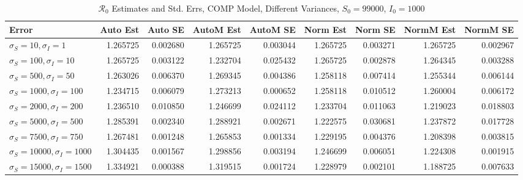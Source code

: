 \documentclass[12pt]{article}
\newcommand{\rr}{\ensuremath{\mathcal{R}_0}}
\begin{document}
\begin{table}[H]
	
	\caption{$\rr$ Estimates and Std. Errs, COMP Model, 
		Different Variances, $S_0 = 99000$, $I_0 = 1000$}
	\begin{footnotesize}
		\hskip -1.7cm
	\begin{tabular}{l|r|r|r|r|r|r|r|r}
		\hline
		Error & Auto Est & Auto SE & AutoM Est & AutoM SE & Norm Est & Norm SE & NormM Est & NormM SE\\
		\hline
		$\sigma_S = 10, \sigma_I = 1$ & 1.265725 & 0.002680 & 1.265725 & 0.003044 & 1.265725 & 0.003271 & 1.265725 & 0.002967\\
		\hline
		$\sigma_S = 100, \sigma_I = 10$ & 1.265725 & 0.003122 & 1.232704 & 0.025432 & 1.265725 & 0.002878 & 1.264345 & 0.003288\\
		\hline
		$\sigma_S = 500, \sigma_I = 50$ & 1.263026 & 0.006370 & 1.269345 & 0.004386 & 1.258118 & 0.007414 & 1.255344 & 0.006144\\
		\hline
		$\sigma_S = 1000, \sigma_I = 100$ & 1.234715 & 0.006079 & 1.273213 & 0.000652 & 1.258118 & 0.010512 & 1.260004 & 0.006172\\
		\hline
		$\sigma_S = 2000, \sigma_I = 200$ & 1.236510 & 0.010850 & 1.246699 & 0.024112 & 1.233704 & 0.011063 & 1.219023 & 0.018803\\
		\hline
		$\sigma_S = 5000, \sigma_I = 500$ & 1.285391 & 0.002340 & 1.288921 & 0.002671 & 1.222575 & 0.030681 & 1.237872 & 0.017728\\
		\hline
		$\sigma_S = 7500, \sigma_I = 750$ & 1.267481 & 0.001248 & 1.265853 & 0.001334 & 1.229195 & 0.004376 & 1.208398 & 0.003815\\
		\hline
		$\sigma_S = 10000, \sigma_I = 1000$ & 1.304435 & 0.001567 & 1.298856 & 0.003194 & 1.246699 & 0.006051 & 1.224308 & 0.001915\\
		\hline
		$\sigma_S = 15000, \sigma_I = 1500$ & 1.334921 & 0.000388 & 1.319515 & 0.001724 & 1.228979 & 0.002101 & 1.188725 & 0.007633\\
		\hline
	\end{tabular}
\end{footnotesize}
\end{table}
\end{document}
